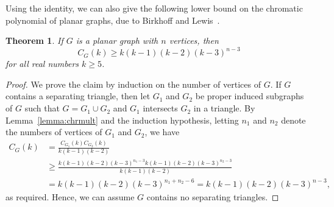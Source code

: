 \documentclass[12pt,twoside,openright,a4paper]{book}
\newtheorem{theorem}{Theorem}[chapter]
\begin{document}
Using the identity, we can also give the following lower bound on the chromatic polynomial of planar graphs,
due to Birkhoff and Lewis~\cite{birkhoff1946chromatic}.
\begin{theorem}\label{thm:birlew}
If $G$ is a planar graph with $n$ vertices, then
$$C_G(k)\ge k(k-1)(k-2)(k-3)^{n-3}$$
for all real numbers $k\ge 5$.
\end{theorem}
\begin{proof}
We prove the claim by induction on the number of vertices of $G$.  If $G$ contains a separating triangle,
then let $G_1$ and $G_2$ be proper induced subgraphs of $G$ such that $G=G_1\cup G_2$ and $G_1$ intersects
$G_2$ in a triangle.  By Lemma~\ref{lemma:chrmult} and the induction hypothesis, letting $n_1$ and $n_2$ denote
the numbers of vertices of $G_1$ and $G_2$, we have
\begin{align*}
C_G(k)&=\frac{C_{G_1}(k)C_{G_2}(k)}{k(k-1)(k-2)}\\
&\ge \frac{k(k-1)(k-2)(k-3)^{n_1-3}k(k-1)(k-2)(k-3)^{n_2-3}}{k(k-1)(k-2)}\\
&=k(k-1)(k-2)(k-3)^{n_1+n_2-6}=k(k-1)(k-2)(k-3)^{n-3},
\end{align*}
as required.  Hence, we can assume $G$ contains no separating triangles.


\end{proof}
\end{document}
